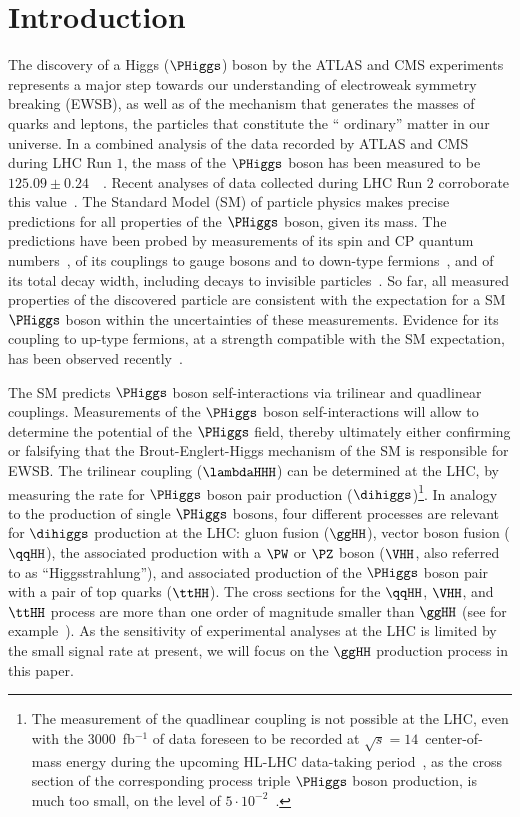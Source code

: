 \section{Introduction}
\label{sec:introduction}

The discovery of a Higgs ($\PHiggs$) boson by the ATLAS and CMS experiments~\cite{Higgs-Discovery_ATLAS,Higgs-Discovery_CMS}
represents a major step towards our understanding of electroweak symmetry breaking (EWSB),
as well as of the mechanism that generates the masses of quarks and leptons, 
the particles that constitute the `` ordinary'' matter in our universe.
In a combined analysis of the data recorded by ATLAS and CMS during LHC Run $1$, 
the mass of the $\PHiggs$ boson has been measured to be $125.09 \pm 0.24$~\GeV~\cite{HIG-14-042}.
Recent analyses of data collected during LHC Run $2$ corroborate this value~\cite{HIG-16-041,Aaboud:2018wps}.
The Standard Model (SM) of particle physics makes precise predictions for all properties of the $\PHiggs$ boson, given its mass. 
The predictions have been probed by measurements of its spin and CP quantum numbers~\cite{HIG-14-018,Aad:2015mxa,Aad:2016nal},
of its couplings to gauge bosons and to down-type fermions~\cite{HIG-15-002},
and of its total decay width, including decays to invisible particles~\cite{HIG-13-030,HIG-14-032,Aad:2015pla}.
So far, all measured properties of the discovered particle are consistent with the expectation for a SM $\PHiggs$ boson 
within the uncertainties of these measurements.
Evidence for its coupling to up-type fermions, at a strength compatible with the SM expectation, has been observed recently~\cite{Aaboud:2018urx,HIG-17-035}.

The SM predicts $\PHiggs$ boson self-interactions via trilinear and quadlinear couplings. 
Measurements of the $\PHiggs$ boson self-interactions will allow to determine the potential of the $\PHiggs$ field,
thereby ultimately either confirming or falsifying that the Brout-Englert-Higgs mechanism of the SM is responsible for EWSB.
The trilinear coupling ($\lambdaHHH$) can be determined at the LHC, by measuring the rate for $\PHiggs$ boson pair production ($\dihiggs$)\footnote{The measurement of the quadlinear coupling is not possible at the LHC, 
even with the $3000$~fb$^{-1}$ of data foreseen to be recorded at $\sqrt{s}=14$~\TeV center-of-mass energy during the upcoming HL-LHC data-taking period~\cite{Cepeda:2019klc}, 
as the cross section of the corresponding process triple $\PHiggs$ boson production, is much too small, 
on the level of $5 \cdot 10^{-2}$~\cite{Plehn:2005nk,Binoth:2006ym}. }. 
In analogy to the production of single $\PHiggs$ bosons, 
four different processes are relevant for $\dihiggs$ production at the LHC: 
gluon fusion ($\ggHH$), vector boson fusion ($\qqHH$), the associated production with a $\PW$ or $\PZ$ boson ($\VHH$, also referred to as ``Higgsstrahlung''),
and associated production of the $\PHiggs$ boson pair with a pair of top quarks ($\ttHH$). The cross sections for the $\qqHH$, $\VHH$, and $\ttHH$ process are more than one order of magnitude smaller than  $\ggHH$ (see for example~\cite{Baglio:2012np}).
As the sensitivity of experimental analyses at the LHC is limited by the small signal rate at present,
we will focus on the $\ggHH$ production process in this paper.

